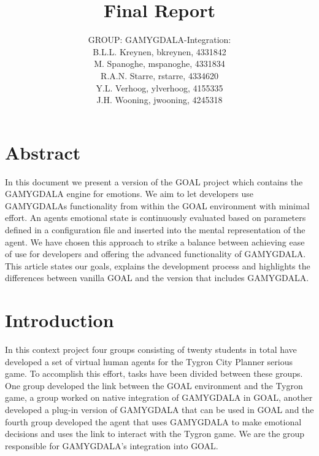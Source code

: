 \documentclass[11pt]{article}
\title{Final Report}
\author{GROUP: GAMYGDALA-Integration:\\
	B.L.L. Kreynen, bkreynen, 4331842\\
	M. Spanoghe, mspanoghe, 4331834\\
	R.A.N. Starre, rstarre, 4334620\\
	Y.L. Verhoog, ylverhoog, 4155335\\
	J.H. Wooning, jwooning, 4245318\\
}
\begin{document}
\maketitle
\pagebreak
\tableofcontents
\pagebreak

\section{Abstract}
In this document we present a version of the GOAL project which contains the GAMYGDALA engine for emotions. We aim to let developers use GAMYGDALAs functionality from within the GOAL environment with minimal effort. An agents emotional state is continuously evaluated based on parameters defined in a configuration file and inserted into the mental representation of the agent. We have chosen this approach to strike a balance between achieving ease of use for developers and offering the advanced functionality of GAMYGDALA. This article states our goals, explains the development process and highlights the differences between vanilla GOAL and the version that includes GAMYGDALA.

\clearpage

\section{Introduction}
In this context project four groups consisting of twenty students in total have developed a set of virtual human \gls{agent}s for the Tygron\cite{Tygron} City Planner serious game. To accomplish this effort, tasks have been divided between these groups. One group developed the link between the \gls{GOAL}\cite{GOAL} environment and the Tygron game, a group worked on native integration of \gls{GAMYGDALA}\cite{GAMYGDALA} in GOAL, another developed a plug-in version of GAMYGDALA that can be used in GOAL and the fourth group developed the \gls{agent} that uses GAMYGDALA to make emotional decisions and uses the link to interact with the Tygron game. We are the group responsible for GAMYGDALA's integration into GOAL. 
\end{document}
